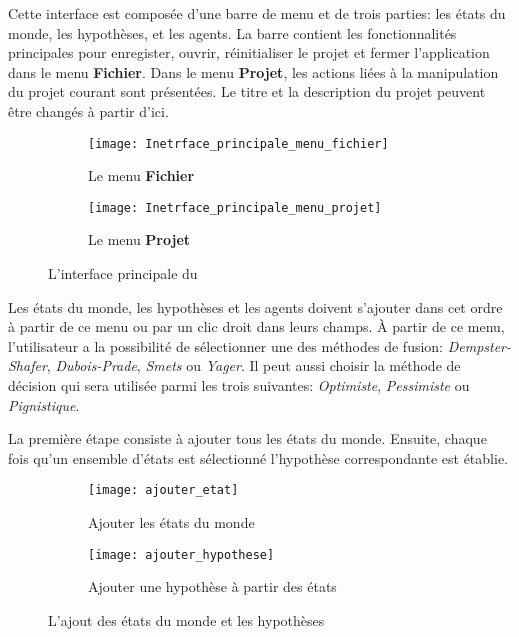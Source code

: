 Cette interface est composée d'une barre de menu et de trois parties: les états
du monde, les hypothèses, et les agents. La barre contient les fonctionnalités principales
pour enregister, ouvrir, réinitialiser le projet et fermer l'application dans le menu
\textbf{Fichier}. Dans le menu \textbf{Projet}, les actions liées à la manipulation
du projet courant sont présentées. Le titre et la description du projet peuvent être changés
à partir d'ici.\\[1em]

\begin{figure}[H]
\begin{subfigure}{0.49\textwidth}
\texttt{[image: Inetrface\_principale\_menu\_fichier]}
\caption{Le menu \textbf{Fichier}}
\end{subfigure}
\hfill
\begin{subfigure}{0.49\textwidth}
\texttt{[image: Inetrface\_principale\_menu\_projet]}
\caption{Le menu \textbf{Projet}}
\end{subfigure}
\caption{L'interface principale du \appname}
\end{figure}

Les états du monde, les hypothèses et les agents doivent s'ajouter dans cet ordre à partir
de ce menu ou par un clic droit dans leurs champs. \`A partir de ce menu, l'utilisateur a la possibilité de sélectionner une
des méthodes de fusion: \textit{Dempster-Shafer}, \textit{Dubois-Prade}, \textit{Smets} ou
\textit{Yager}. Il peut aussi choisir la méthode de décision qui sera utilisée parmi les trois
suivantes: \textit{Optimiste}, \textit{Pessimiste} ou \textit{Pignistique}.

La première étape consiste à ajouter tous les états du monde. Ensuite, chaque fois qu'un ensemble d'états est sélectionné
l'hypothèse correspondante est établie.\\[1em]

\begin{figure}[H]
\begin{subfigure}{0.49\textwidth}
\texttt{[image: ajouter\_etat]}
\caption{Ajouter les états du monde}
\end{subfigure}
\hfill
\begin{subfigure}{0.49\textwidth}
\texttt{[image: ajouter\_hypothese]}
\caption{Ajouter une hypothèse à partir des états}
\end{subfigure}
\caption{L'ajout des états du monde et les hypothèses}
\end{figure}

